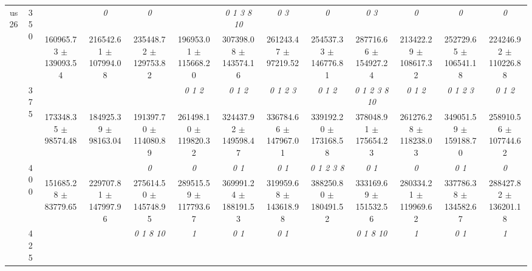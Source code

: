 \begin{table}[h]
{\begin{tabular}{
        ccccccccccccc}
 \multirow{4}{*}{us26} & \multirow{2}{*}{350}& & \textit{ 0 }& \textit{ 0 }& & \textit{  0  1  3  8 10 }& \textit{ 0 3 }& \textit{ 0 }& \textit{ 0 3 }& \textit{ 0 }& \textit{ 0 }& \textit{ 0 } \\ 
 & & 160965.73 $\pm$ 139093.54& 216542.61 $\pm$ 107994.08& 235448.72 $\pm$ 129753.82& 196953.01 $\pm$ 115668.20& 307398.08 $\pm$ 143574.16& 261243.47 $\pm$ 97219.52& 254537.33 $\pm$ 146776.81& 287716.66 $\pm$ 154927.24& 213422.29 $\pm$ 108617.32& 252729.65 $\pm$ 106541.18& 224246.92 $\pm$ 110226.88 \\ 
 & \multirow{2}{*}{375}& \cellcolor[HTML]{EFEFEF} & \cellcolor[HTML]{EFEFEF} & \cellcolor[HTML]{EFEFEF} & \cellcolor[HTML]{EFEFEF} \textit{ 0 1 2 }& \cellcolor[HTML]{EFEFEF} \textit{ 0 1 2 }& \cellcolor[HTML]{EFEFEF} \textit{ 0 1 2 3 }& \cellcolor[HTML]{EFEFEF} \textit{ 0 1 2 }& \cellcolor[HTML]{EFEFEF} \textit{  0  1  2  3  8 10 }& \cellcolor[HTML]{EFEFEF} \textit{ 0 1 2 }& \cellcolor[HTML]{EFEFEF} \textit{ 0 1 2 3 }& \cellcolor[HTML]{EFEFEF} \textit{ 0 1 2 } \\ 
 & & \cellcolor[HTML]{EFEFEF} 173348.35 $\pm$ 98574.48& \cellcolor[HTML]{EFEFEF} 184925.39 $\pm$ 98163.04& \cellcolor[HTML]{EFEFEF} 191397.70 $\pm$ 114080.89& \cellcolor[HTML]{EFEFEF} 261498.10 $\pm$ 119820.32& \cellcolor[HTML]{EFEFEF} 324437.92 $\pm$ 149598.47& \cellcolor[HTML]{EFEFEF} 336784.66 $\pm$ 147967.01& \cellcolor[HTML]{EFEFEF} 339192.20 $\pm$ 173168.58& \cellcolor[HTML]{EFEFEF} 378048.91 $\pm$ 175654.23& \cellcolor[HTML]{EFEFEF} 261276.28 $\pm$ 118238.03& \cellcolor[HTML]{EFEFEF} 349051.59 $\pm$ 159188.70& \cellcolor[HTML]{EFEFEF} 258910.56 $\pm$ 107744.62 \\ 
 & \multirow{2}{*}{400}& & & \textit{ 0 }& \textit{ 0 }& \textit{ 0 1 }& \textit{ 0 1 }& \textit{ 0 1 2 3 8 }& \textit{ 0 1 }& \textit{ 0 }& \textit{ 0 1 }& \textit{ 0 } \\ 
 & & 151685.28 $\pm$ 83779.65& 229707.81 $\pm$ 147997.96& 275614.50 $\pm$ 145748.95& 289515.59 $\pm$ 117793.67& 369991.24 $\pm$ 188191.53& 319959.68 $\pm$ 143618.98& 388250.80 $\pm$ 180491.52& 333169.69 $\pm$ 151532.56& 280334.21 $\pm$ 119969.62& 337786.38 $\pm$ 134582.67& 288427.82 $\pm$ 136201.18 \\ 
 & \multirow{2}{*}{425}& \cellcolor[HTML]{EFEFEF} & \cellcolor[HTML]{EFEFEF} & \cellcolor[HTML]{EFEFEF} \textit{  0  1  8 10 }& \cellcolor[HTML]{EFEFEF} \textit{ 1 }& \cellcolor[HTML]{EFEFEF} \textit{ 0 1 }& \cellcolor[HTML]{EFEFEF} \textit{ 0 1 }& \cellcolor[HTML]{EFEFEF} & \cellcolor[HTML]{EFEFEF} \textit{  0  1  8 10 }& \cellcolor[HTML]{EFEFEF} \textit{ 1 }& \cellcolor[HTML]{EFEFEF} \textit{ 0 1 }& \cellcolor[HTML]{EFEFEF} \textit{ 1 } \\ 

\end{tabular}}
\end{table}

